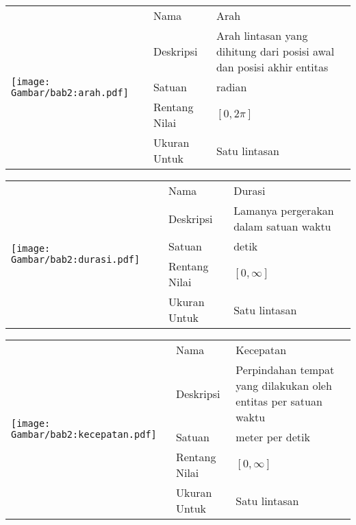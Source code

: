 \begin{table}[h!]
    \centering
    \begin{tabular}{|m{4cm}|l|p{8cm}|} 
        \hline
        \multirow{5}{*}{
            \texttt{[image: Gambar/bab2:arah.pdf]}
        } & Nama & Arah \\ 
        \cline{2-3}
        & Deskripsi & Arah lintasan yang dihitung dari posisi awal dan posisi akhir entitas                    \\ 
        \cline{2-3}
        & Satuan & radian                    \\ 
        \cline{2-3}
        & Rentang Nilai & $[0, 2\pi]$                    \\ 
        \cline{2-3}
        & Ukuran Untuk & Satu lintasan                    \\
        \hline
    \end{tabular}
\end{table}

\begin{table}[h!]
    \centering
    \begin{tabular}{|m{4cm}|l|p{8cm}|} 
        \hline
        \multirow{5}{*}{
            \texttt{[image: Gambar/bab2:durasi.pdf]}
        } & Nama & Durasi \\ 
        \cline{2-3}
        & Deskripsi & Lamanya pergerakan dalam satuan waktu                    \\ 
        \cline{2-3}
        & Satuan & detik                    \\ 
        \cline{2-3}
        & Rentang Nilai & $[0, \infty]$                    \\ 
        \cline{2-3}
        & Ukuran Untuk & Satu lintasan                    \\
        \hline
    \end{tabular}
\end{table}

\begin{table}[h!]
    \centering
    \begin{tabular}{|m{4cm}|l|p{8cm}|} 
        \hline
        \multirow{5}{*}{
            \texttt{[image: Gambar/bab2:kecepatan.pdf]}
        } & Nama & Kecepatan \\ 
        \cline{2-3}
        & Deskripsi & Perpindahan tempat yang dilakukan oleh entitas per satuan waktu                    \\ 
        \cline{2-3}
        & Satuan & meter per detik                   \\ 
        \cline{2-3}
        & Rentang Nilai & $[0, \infty]$                    \\ 
        \cline{2-3}
        & Ukuran Untuk & Satu lintasan                    \\
        \hline
    \end{tabular}
\end{table}

